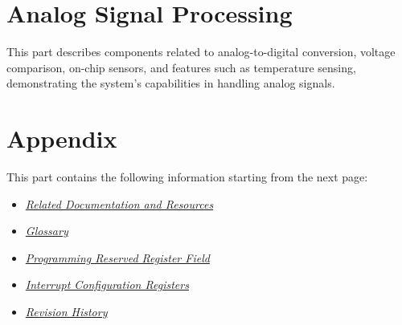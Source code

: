 \documentclass[openany, 10pt]{book}
\begin{document}

\part{Analog Signal Processing}


This part describes components related to analog-to-digital conversion, voltage comparison, on-chip sensors, and features such as temperature sensing, demonstrating the system's capabilities in handling analog signals.




\part{Appendix}\label{appendix}

This part contains the following information starting from the next page:

\begin{itemize}
    \item \hyperref[sec:resources]{\textit{Related Documentation and Resources}}
    \item \hyperref[glossary]{\textit{Glossary}}
    \item \hyperref[programming-reserved-field]{\textit{Programming Reserved Register Field}}
    \item \hyperref[interrupt-config-registers]{\textit{Interrupt Configuration Registers}}
    \item \hyperref[revision-history]{\textit{Revision History}}
\end{itemize}



\clearpage


\clearpage


\clearpage


\clearpage


\clearpage


\clearpage

\end{document}
